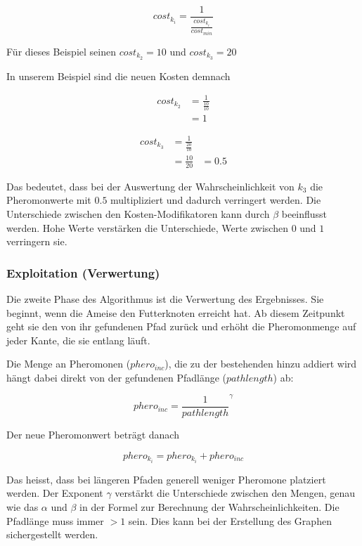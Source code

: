 \[ cost_{k_i} = \frac{1}{\frac{cost_{k_i}}{cost_{min}}} \]

Für dieses Beispiel seinen $cost_{k_2} = 10$ und $cost_{k_3} = 20$

In unserem Beispiel sind die neuen Kosten demnach

\begin{equation*}
\begin{split}
cost_{k_2} & = \frac{1}{\frac{10}{10}} \\
           & = 1
\end{split}
\end{equation*}

\begin{equation*}
\begin{split}
cost_{k_3} & = \frac{1}{\frac{20}{10}} \\
           & = \frac{10}{20}
           & = 0.5
\end{split}
\end{equation*}

Das bedeutet, dass bei der Auswertung der Wahrscheinlichkeit von $k_3$ die Pheromonwerte mit $0.5$ multipliziert und dadurch verringert werden. Die Unterschiede zwischen den Kosten-Modifikatoren kann durch $\beta$ beeinflusst werden. Hohe Werte verstärken die Unterschiede, Werte zwischen $0$ und $1$ verringern sie.

\subsubsection*{Exploitation (Verwertung)}

Die zweite Phase des Algorithmus ist die Verwertung des Ergebnisses. Sie beginnt, wenn die Ameise den Futterknoten erreicht hat. Ab diesem Zeitpunkt geht sie den von ihr gefundenen Pfad zurück und erhöht die Pheromonmenge auf jeder Kante, die sie entlang läuft.

Die Menge an Pheromonen ($phero_{inc}$), die zu der bestehenden hinzu addiert wird hängt dabei direkt von der gefundenen Pfadlänge ($pathlength$) ab:

\[ phero_{inc} = {\frac{1}{pathlength}}^\gamma \]

Der neue Pheromonwert beträgt danach 

\[ phero_{k_i} = phero_{k_i} + phero_{inc} \]

Das heisst, dass bei längeren Pfaden generell weniger Pheromone platziert werden. Der Exponent $\gamma$ verstärkt die Unterschiede zwischen den Mengen, genau wie das $\alpha$ und $\beta$ in der Formel zur Berechnung der Wahrscheinlichkeiten. Die Pfadlänge muss immer $> 1$ sein. Dies kann bei der Erstellung des Graphen sichergestellt werden.

